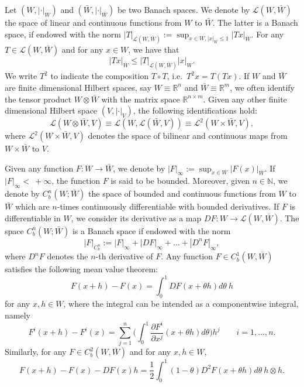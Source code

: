 \documentclass[11pt,a4paper]{article}
\newcommand{\R}{\mathbb{R}}
\theoremstyle{plain}
\begin{document}
 Let $(W,|\cdot|_W)$ and $(\bar{W},|\cdot|_{\bar{W}})$ be two Banach spaces. We denote by $\mathscr{L}(W,\bar{W})$ the space of linear and continuous functions from $W$ to $\bar{W}$. The latter is a Banach space, if endowed with the norm $|T|_{\mathscr{L}(W,\bar{W})} := \sup_{x \in W, |x|_W\le 1} |Tx|_{\bar{W}}$. For any $T \in \mathscr{L}(W,\bar{W})$ and for any $x \in W$, we have that \begin{equation*}
    |Tx|_{\bar{W}} \le |T|_{\mathscr{L}(W,\bar{W})}|x|_W.
\end{equation*} 
We write $T^2$ to indicate the composition $T \circ T$, i.e.\ $T^2 x = T(Tx)$.
If $W$ and $\bar{W}$ are finite dimensional Hilbert spaces, say $W \equiv \R^n$ and $\bar{W} \equiv \R^m$, we often identify the tensor product $W \otimes \bar{W}$ with the matrix space $\R^{n\times m}$.
Given any other finite dimensional Hilbert space $(V,|\cdot|_V)$, the following identifications hold: \begin{equation*}
    \mathscr{L}(W \otimes \bar{W},V) \equiv \mathscr{L}(W,\mathscr{L}(\bar{W},V)) \equiv \mathscr{L}^2(W \times \bar{W},V),
\end{equation*} where $\mathscr{L}^2(W \times \bar{W},V)$ denotes the space of bilinear and continuous maps from $W \times \bar{W}$ to $V$.

Given any function $F:W \to \bar{W}$, we denote by $|F|_\infty := \sup_{x \in W} |F(x)|_{\bar{W}}$. If $|F|_\infty<~+\infty$, the function $F$ is said to be bounded. Moreover, given $n \in \mathbb{N}$, we denote by ${C}^n_b(W;\bar{W})$ the space of bounded and continuous functions from $W$ to $\bar{W}$ which are $n$-times continuously differentiable with bounded derivatives.
If $F$ is differentiable in $W$, we consider its derivative as a map $DF:W \to \mathscr{L}(W,\bar{W})$. 
The space ${C}^n_b(W;\bar{W})$ is a Banach space if endowed with the norm \begin{equation*}
    |F|_{{C}_b^n} := |F|_\infty + |DF|_\infty + \dots + |D^nF|_\infty,
\end{equation*} 
where $D^nF$ denotes the $n$-th derivative of $F$.
Any function $F \in {C}^1_b(W,\bar{W})$ satisfies the following mean value theorem: \begin{equation*}
    F(x+h) - F(x) = \int_0^1 DF(x+\theta h) d\theta \  h
\end{equation*} for any $x,h \in W$, where the integral can be intended as a componentwise integral, namely \begin{equation*}
    F^i(x+h) - F^i(x) = \sum_{j=1}^n \big(\int_0^1 \frac{\partial F^i}{\partial x^j}(x+\theta h) d\theta \big) h^j \qquad i=1,\dots,n.
\end{equation*}
Similarly, for any $F \in {C}^2_b(W,\bar{W})$ and for any $x,h \in W$, \begin{equation*}
    F(x+h) - F(x) - DF(x) h = \frac{1}{2} \int_0^1 (1-\theta) D^2F(x +\theta h) d\theta \ h \otimes h.
\end{equation*}
\end{document}
